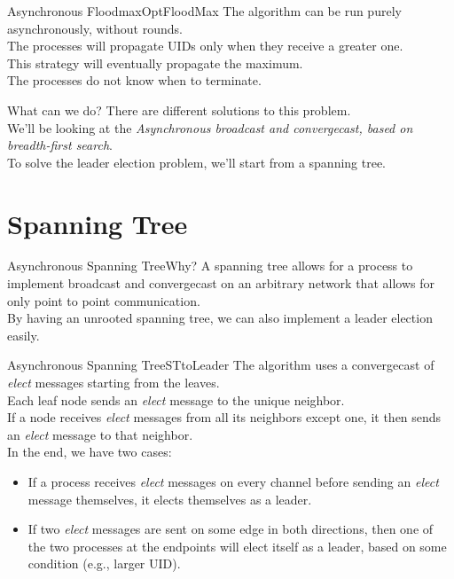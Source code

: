 \documentclass[pdf]{beamer}
\begin{document}
\begin{frame}{Asynchronous Floodmax}{OptFloodMax}
    The algorithm can be run purely asynchronously, without rounds.\\
    The processes will propagate UIDs only when they receive a greater one.\\
    \pause
    \vspace{12pt}
    This strategy will eventually propagate the maximum.\\
    \pause
    \vspace{12pt}
    The processes do not know when to terminate.
\end{frame}

\begin{frame}{What can we do?}
    There are different solutions to this problem.\\
    \vspace{12pt}
    We'll be looking at the \emph{Asynchronous broadcast and convergecast, based on breadth-first search}.\\
    \vspace{12pt}
    To solve the leader election problem, we'll start from a spanning tree.
\end{frame}

\section{Spanning Tree}
\begin{frame}{Asynchronous Spanning Tree}{Why?}
    A spanning tree allows for a process to implement broadcast and convergecast on
    an arbitrary network that allows for only point to point communication.\\
    \vspace{12pt}
    By having an unrooted spanning tree, we can also implement a leader election 
    easily.
\end{frame}

\begin{frame}{Asynchronous Spanning Tree}{STtoLeader}
    The algorithm uses a convergecast of \emph{elect} messages starting from the leaves.\\
    Each leaf node sends an \emph{elect} message to the unique neighbor.\\
    If a node receives \emph{elect} messages from all its neighbors except one, it 
    then sends an \emph{elect} message to that neighbor.\\
    \vspace{12pt}
    In the end, we have two cases:
    \begin{itemize}
        \item{If a process receives \emph{elect} messages on every channel before
              sending an \emph{elect} message themselves, it elects themselves as a leader.}
        \item{If two \emph{elect} messages are sent on some edge in both directions, then
          one of the two processes at the endpoints will elect itself as a leader, based 
          on some condition (e.g., larger UID).}
    \end{itemize}
\end{frame}
\end{document}

